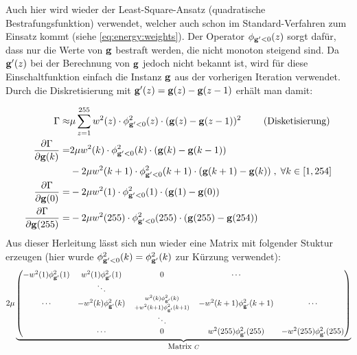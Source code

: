 Auch hier wird wieder der Least-Square-Ansatz (quadratische Bestrafungsfunktion) verwendet, welcher auch schon im Standard-Verfahren zum Einsatz kommt (siehe \autoref{eq:energy:weights}). Der Operator $\phi_{\mathbf g'<0} (z)$ sorgt dafür, dass nur die Werte von $\mathbf g$ bestraft werden, die nicht monoton steigend sind. Da $\mathbf g'(z)$ bei der Berechnung von $\mathbf g$ jedoch nicht bekannt ist, wird für diese Einschaltfunktion einfach die Instanz $\mathbf g$ aus der vorherigen Iteration verwendet. Durch die Diskretisierung mit $\mathbf g'(z) = \mathbf g(z)-\mathbf g(z-1)$ erhält man damit:

\begin{align}
\Gamma \approx & \mu \sum_{z=1}^{255} w^2(z) \cdot \phi^2_{\mathbf g'<0}(z) \cdot (\mathbf g(z)- \mathbf g(z-1))^2 \qquad \mbox{ (Disketisierung)}\\
\label{eq:mon:diskret}
\frac{\partial \Gamma}{\partial \mathbf g(k)} =& 2\mu w^2(k) \cdot \phi^2_{\mathbf g'<0}(k)\cdot(\mathbf g(k)-\mathbf g(k-1)) \nonumber \\
         &- 2 \mu w^2(k+1) \cdot \phi^2_{\mathbf g'<0}(k+1)\cdot(\mathbf g(k+1)-\mathbf g(k))
        \; , \; \forall k \in [1,254]\\
\frac{\partial \Gamma}{\partial \mathbf g(0)} =& -2\mu w^2(1) \cdot \phi^2_{\mathbf g'<0}(1)\cdot(\mathbf g(1)-\mathbf g(0))\\
\frac{\partial \Gamma}{\partial \mathbf g(255)} =& -2\mu w^2(255) \cdot \phi^2_{\mathbf g'<0}(255)\cdot(\mathbf g(255)-\mathbf g(254))
\end{align}
Aus dieser Herleitung lässt sich nun wieder eine Matrix mit folgender Stuktur erzeugen (hier wurde $\phi^2_{\mathbf g'<0}(k) = \phi^2_{\mathbf g'}(k)$ zur Kürzung verwendet):
\small
\begin{align}
2\mu 
\underbrace{\begin{pmatrix}
-w^2(1)\phi^2_{\mathbf g'}(1) &w^2(1)\phi^2_{\mathbf g'}(1) & 0 & \cdots\\
& \ddots\\
\cdots & -w^2(k)\phi^2_{\mathbf g'}(k) & 
\begin{smallmatrix}
w^2(k)\phi^2_{\mathbf g'}(k) \\+ w^2(k+1)\phi^2_{\mathbf g'}(k+1)
\end{smallmatrix}
 & -w^2(k+1)\phi^2_{\mathbf g'}(k+1) & \cdots \\
& & \ddots\\
& \cdots &  0 & w^2(255)\phi^2_{\mathbf g'}(255) & - w^2(255)\phi^2_{\mathbf g'}(255) \\
\end{pmatrix}}_{\mbox{Matrix } C}
\end{align}
\normalfont

